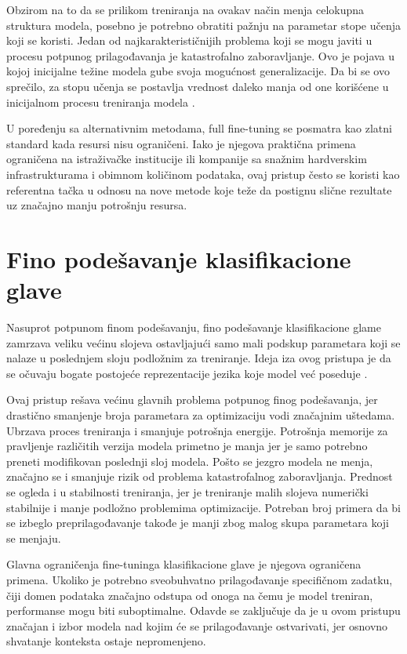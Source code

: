 \documentclass[12pt,oneside]{memoir}
\begin{document}
Obzirom na to da se prilikom treniranja na ovakav način menja celokupna struktura modela, posebno je potrebno obratiti pažnju na parametar stope učenja koji se koristi.
Jedan od najkarakterističnijih problema koji se mogu javiti u procesu potpunog prilagođavanja je katastrofalno zaboravljanje. Ovo je pojava u kojoj inicijalne težine modela gube svoja mogućnost generalizacije. Da bi se ovo sprečilo, za stopu učenja se  postavlja vrednost daleko manja od one korišćene u inicijalnom procesu treniranja modela \cite{zhai2023catastrophicforgetting}.

U poređenju sa alternativnim metodama, full fine-tuning se posmatra kao zlatni standard kada resursi nisu ograničeni. Iako je njegova praktična primena ograničena na istraživačke institucije ili kompanije sa snažnim hardverskim infrastrukturama i obimnom količinom podataka, ovaj pristup često se koristi kao referentna tačka u odnosu na nove metode koje teže da postignu slične rezultate uz značajno manju potrošnju resursa. 

\section {Fino podešavanje klasifikacione glave}
Nasuprot potpunom finom podešavanju, fino podešavanje klasifikacione glame zamrzava veliku većinu slojeva ostavljajući samo mali podskup parametara koji se nalaze u poslednjem sloju podložnim za treniranje. Ideja iza ovog pristupa je da se očuvaju bogate postojeće reprezentacije jezika koje model već poseduje \cite{BertModel}.

Ovaj pristup rešava većinu glavnih problema potpunog finog podešavanja, jer drastično smanjenje broja parametara za optimizaciju vodi značajnim uštedama. Ubrzava proces treniranja i smanjuje potrošnja energije. Potrošnja memorije za pravljenje različitih verzija modela primetno je manja jer je samo potrebno preneti modifikovan poslednji sloj modela. Pošto se jezgro modela ne menja, značajno se i smanjuje rizik od problema katastrofalnog zaboravljanja. Prednost se ogleda i u stabilnosti treniranja, jer je treniranje malih slojeva numerički stabilnije i manje podložno problemima optimizacije\cite{mosbach2021stabilityfinetuningbert}. Potreban broj primera da bi se izbeglo preprilagođavanje takođe je manji zbog malog skupa parametara koji se menjaju.

Glavna ograničenja fine-tuninga klasifikacione glave je njegova ograničena primena. Ukoliko je potrebno sveobuhvatno prilagođavanje specifičnom zadatku, čiji domen podataka značajno odstupa od onoga na čemu je model treniran, performanse mogu biti suboptimalne. Odavde se zaključuje da je u ovom pristupu značajan i izbor modela nad kojim će se prilagođavanje ostvarivati, jer osnovno shvatanje konteksta ostaje nepromenjeno.
\end{document}

